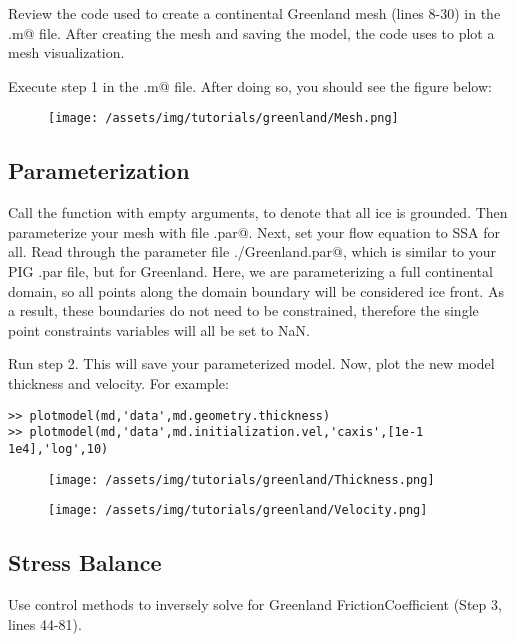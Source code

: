 Review the code used to create a continental Greenland mesh (lines 8-30) in the \verb@readme.m@ file. After creating the mesh and saving the model, the code uses \verb@plotmodel@ to plot a mesh visualization.

Execute step 1 in the \verb@runme.m@ file. After doing so, you should see the figure below:
\begin{figure}[H]
	\begin{center}
		\texttt{[image: /assets/img/tutorials/greenland/Mesh.png]}
	\end{center}
\end{figure}
\subsection{Parameterization} %
Call the \verb@setmask@ function with empty arguments, to denote that all ice is grounded. Then parameterize your mesh with file \verb@Greenland.par@. Next, set your flow equation to SSA for all. Read through the parameter file \verb@./Greenland.par@, which is similar to your PIG .par file, but for Greenland. Here, we are parameterizing a full continental domain, so all points along the domain boundary will be considered ice front. As a result, these boundaries do not need to be constrained, therefore the single point constraints variables will all be set to NaN.

Run step 2. This will save your parameterized model. Now, plot the new model thickness and velocity. For example:
\begin{verbatim}>> plotmodel(md,'data',md.geometry.thickness)
>> plotmodel(md,'data',md.initialization.vel,'caxis',[1e-1 1e4],'log',10)\end{verbatim}

\begin{figure}[H]
	\begin{center}
		\texttt{[image: /assets/img/tutorials/greenland/Thickness.png]}
	\end{center}
\end{figure}

\begin{figure}[H]
	\begin{center}
		\texttt{[image: /assets/img/tutorials/greenland/Velocity.png]}
	\end{center}
\end{figure}
\subsection{Stress Balance} %
Use control methods to inversely solve for Greenland FrictionCoefficient (Step 3, lines 44-81).

